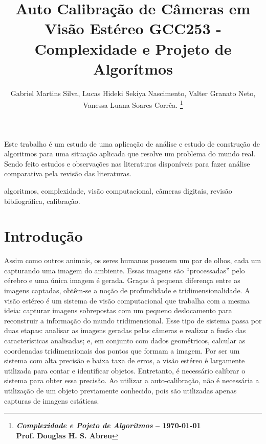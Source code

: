 \documentclass[portuguese]{sbrt}
\begin{document}
 
  
\title{Auto Calibração de Câmeras em Visão Estéreo GCC253 - Complexidade e Projeto de Algorítmos} 
  
\author{Gabriel Martins Silva, Lucas Hideki Sekiya Nascimento, Valter Granato Neto, Vanessa Luana Soares Corrêa. 
\thanks{\centering \textbf{\textit{Complexidade e Pojeto de Algorítmos} -- \today \\ Prof. Douglas H. S. Abreu}}%
} 
  
\maketitle 

  
  
  
  
\begin{resumo} 
Este trabalho é um estudo de uma aplicação de análise e estudo de construção de algoritmos para uma situação aplicada que resolve um problema do mundo real. Sendo feito estudos e observações nas literaturas disponíveis para fazer análise comparativa pela revisão das literaturas.  
\end{resumo} 
\begin{chave} 
algoritmos, complexidade, visão computacional, câmeras digitais, revisão bibliográfica, calibração. 
\end{chave} 
  

  
  

\section{Introdução} 
\label{sec:introducao} 
  
Assim como outros animais, os seres humanos possuem um par de olhos, cada um capturando uma imagem do ambiente. Essas imagens são “processadas” pelo cérebro e uma única imagem é gerada. Graças à pequena diferença entre as imagens captadas, obtêm-se a noção de profundidade e tridimensionalidade. A visão estéreo é um sistema de visão computacional que trabalha com a mesma ideia: capturar imagens sobrepostas com um pequeno deslocamento para reconstruir a informação do mundo tridimensional.
Esse tipo de sistema passa por duas etapas: analisar as imagens geradas pelas câmeras e realizar a fusão das características analisadas; e, em conjunto com dados geométricos, calcular as coordenadas tridimensionais dos pontos que formam a imagem.
Por ser um sistema com alta precisão e baixa taxa de erros, a visão estéreo é largamente utilizada para contar e identificar objetos. Entretanto, é necessário calibrar o sistema para obter essa precisão. Ao utilizar a auto-calibração, não é necessária a utilização de um objeto previamente conhecido, pois são utilizadas apenas capturas de imagens estáticas.
~\cite{cormen:2009}
\end{document}
